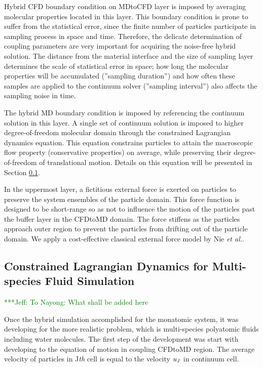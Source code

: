 \documentclass[]{aiaa-tc}%
\newcommand{\skonote}[1]{ {\textcolor{green} { ***Jeff: #1 }}}
\begin{document}
Hybrid CFD boundary condition on MDtoCFD layer is imposed by averaging
molecular properties located in this layer. This boundary condition is prone to
suffer from the statistical error\cite{Hadjicon3,Time_Mechanism}, since
the finite number of particles participate in sampling process in space and time.
Therefore, the delicate determination of coupling parameters are very important
for acquiring the noise-free hybrid solution. The distance from the material 
interface and the size of sampling layer determines the scale of statistical 
error in space; how long the molecular properties will be accumulated
(''sampling duration'') and how often these samples are applied to the 
continuum solver (''sampling interval'') also affects the sampling noise in time.

The hybrid MD boundary condition is imposed by referencing the continuum solution
in this layer. A single set of continuum solution is imposed to higher
degree-of-freedom molecular domain through the constrained Lagrangian dynamics
equation. This equation constrains particles to attain the macroscopic flow property 
(conservative properties) on average, while preserving their degree-of-freedom of 
translational motion. Details on this equation will be presented in Section
\ref{sec:hybrid_multispecies}.

In the uppermost layer, a fictitious external force is exerted on particles 
to preserve the system ensembles of the particle domain. This force function
is designed to be short-range so as not to influence the motion of the particles 
past the buffer layer in the CFDtoMD domain. The force stiffens as the particles 
approach outer region to prevent the particles from drifting out of the 
particle domain. We apply a cost-effective classical external force model 
by Nie {\it{et al.}}\cite{Nie}. 


\subsection{Constrained Lagrangian Dynamics for Multi-species Fluid Simulation}
\label{sec:hybrid_multispecies}

\skonote{To Nayong: What shall be added here}

Once the hybrid simulation accomplished for the monatomic system, it was developing for the more realistic problem, which is multi-species polyatomic fluids including water molecules.  The first step of the development was start with developing to the equation of motion in coupling CFDtoMD region. The average velocity of particles in J{\it{th}} cell is equal to the velocity $\it u_J$ in continuum cell.
\end{document}
